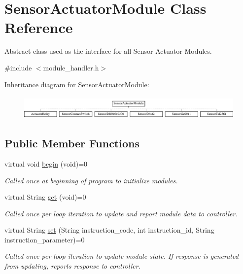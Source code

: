 \hypertarget{class_sensor_actuator_module}{}\section{Sensor\+Actuator\+Module Class Reference}
\label{class_sensor_actuator_module}


Abstract class used as the interface for all Sensor Actuator Modules.  




{\ttfamily \#include $<$module\+\_\+handler.\+h$>$}

Inheritance diagram for Sensor\+Actuator\+Module\+:\begin{figure}[H]
\begin{center}
\leavevmode
\includegraphics[height=1.244444cm]{class_sensor_actuator_module}
\end{center}
\end{figure}
\subsection*{Public Member Functions}
\begin{DoxyCompactItemize}
\item 
virtual void \hyperlink{class_sensor_actuator_module_a453094bcf7c7a2fdb2a14f65bf18bff9}{begin} (void)=0
\begin{DoxyCompactList}\small\item\em Called once at beginning of program to initialize modules. \end{DoxyCompactList}\item 
virtual String \hyperlink{class_sensor_actuator_module_a55ce31fe50fc64f90602f3f70c5dc1af}{get} (void)=0
\begin{DoxyCompactList}\small\item\em Called once per loop iteration to update and report module data to controller. \end{DoxyCompactList}\item 
virtual String \hyperlink{class_sensor_actuator_module_adf93ff40fbdfeecbb8711ea0626fe6fc}{set} (String instruction\+\_\+code, int instruction\+\_\+id, String instruction\+\_\+parameter)=0
\begin{DoxyCompactList}\small\item\em Called once per loop iteration to update module state. If response is generated from updating, reports response to controller. \end{DoxyCompactList}\end{DoxyCompactItemize}


